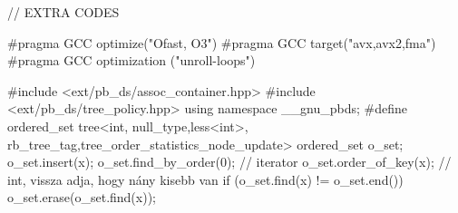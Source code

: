 // EXTRA CODES

#pragma GCC optimize("Ofast, O3")
#pragma GCC target("avx,avx2,fma")
#pragma GCC optimization ("unroll-loops")

#include <ext/pb_ds/assoc_container.hpp> 
#include <ext/pb_ds/tree_policy.hpp> 
using namespace __gnu_pbds;
#define ordered_set tree<int, null_type,less<int>, rb_tree_tag,tree_order_statistics_node_update> 
ordered_set o_set; 
o_set.insert(x); 
o_set.find_by_order(0); // iterator
o_set.order_of_key(x); // int, vissza adja, hogy nány kisebb van
if (o_set.find(x) != o_set.end()) o_set.erase(o_set.find(x));